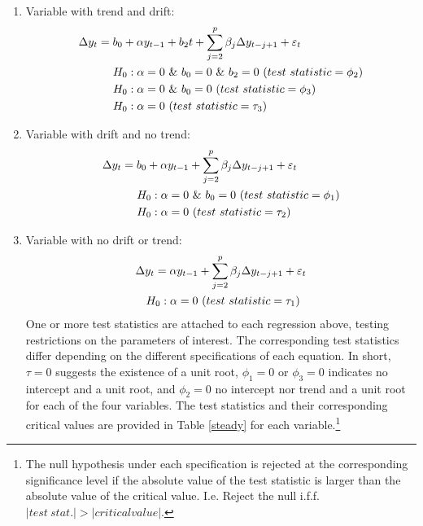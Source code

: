 \documentclass[11pt,preprint, authoryear]{elsarticle}
\numberwithin{equation}{section}
\numberwithin{figure}{section}
\numberwithin{table}{section}
\def\tightlist{} %
\let\rmarkdownfootnote\footnote%
\def\footnote{\protect\rmarkdownfootnote}
\begin{document}
\begin{enumerate}
\def\labelenumi{\roman{enumi}.}
\tightlist
\item
  Variable with trend and drift: \begin{align}
  \Delta y_t = b_0 +  \alpha y_{t-1}& + b_2 t + \sum_{j=2}^{p} \beta_j \Delta y_{t-j +1} + \varepsilon_t \label{adf1} \\
  H_0 : \alpha =0& \ \& \ b_0=0 \ \& \ b_2 = 0 \ (test \ statistic = \phi_2) \notag \\
  H_0 : \alpha =0& \ \& \ b_0=0  \ (test \ statistic = \phi_3) \notag \\
  H_0 : \alpha =0& \ (test \ statistic = \tau_3) \notag
  \end{align}
\item
  Variable with drift and no trend: \begin{align}
  \Delta y_t = b_0 +  \alpha y_{t-1}& + \sum_{j=2}^{p} \beta_j \Delta y_{t-j +1} + \varepsilon_t  \label{adf2} \\
  H_0 : \alpha =0& \ \& \ b_0=0  \ (test \ statistic = \phi_1) \notag \\
  H_0 : \alpha =0& \ (test \ statistic = \tau_2) \notag
  \end{align}
\item
  Variable with no drift or trend: \begin{align}
  \Delta y_t =  \alpha y_{t-1}& + \sum_{j=2}^{p} \beta_j \Delta y_{t-j +1} + \varepsilon_t  \label{adf3} \\
  H_0 : \alpha =0& \ (test \ statistic = \tau_1) \notag
  \end{align} One or more test statistics are attached to each
  regression above, testing restrictions on the parameters of interest.
  The corresponding test statistics differ depending on the different
  specifications of each equation. In short, \(\tau =0\) suggests the
  existence of a unit root, \(\phi_1=0\) or \(\phi_3=0\) indicates no
  intercept and a unit root, and \(\phi_2=0\) no intercept nor trend and
  a unit root for each of the four variables. The test statistics and
  their corresponding critical values are provided in Table \ref{steady}
  for each variable.\footnote{The null hypothesis under each
    specification is rejected at the corresponding significance level if
    the absolute value of the test statistic is larger than the absolute
    value of the critical value. I.e. Reject the null i.f.f.
    \(|test \ stat.| > |critical value|\).}
\end{enumerate}
\end{document}
